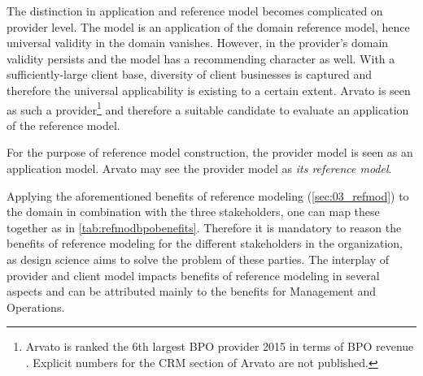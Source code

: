 The distinction in application and reference model becomes complicated on provider level. The model is an application of the domain reference model, hence universal validity in the domain vanishes. However, in the provider's domain validity persists and the model has a recommending character as well. With a sufficiently-large client base, diversity of client businesses is captured and therefore the universal applicability is existing to a certain extent. Arvato is seen as such a provider\footnote{Arvato is ranked the 6th largest BPO provider 2015 in terms of BPO revenue \citep{hfs2016top}. Explicit numbers for the CRM section of Arvato are not published.} and therefore a suitable candidate to evaluate an application of the reference model. 

For the purpose of reference model construction, the provider model is seen as an application model. Arvato may see the provider model as \textit{its reference model}.

Applying the aforementioned benefits of reference modeling (\cf \ref{sec:03_refmod}) to the domain in combination with the three stakeholders, one can map these together as in \Tab \ref{tab:refmodbpobenefits}. Therefore it is mandatory to reason the benefits of reference modeling for the different stakeholders in the organization, as design science aims to solve the problem of these parties. The interplay of provider and client model impacts benefits of reference modeling in several aspects and can be attributed mainly to the benefits for Management and Operations.


